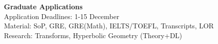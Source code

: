 \noindent \textbf{\Huge Graduate Applications}\\
\noindent Application Deadlines: 1-15 December\\
\noindent Material: SoP, GRE, GRE(Math), IELTS/TOEFL, Transcripts, LOR\\
\noindent Research: Transforms, Hyperbolic Geometry (Theory+DL)